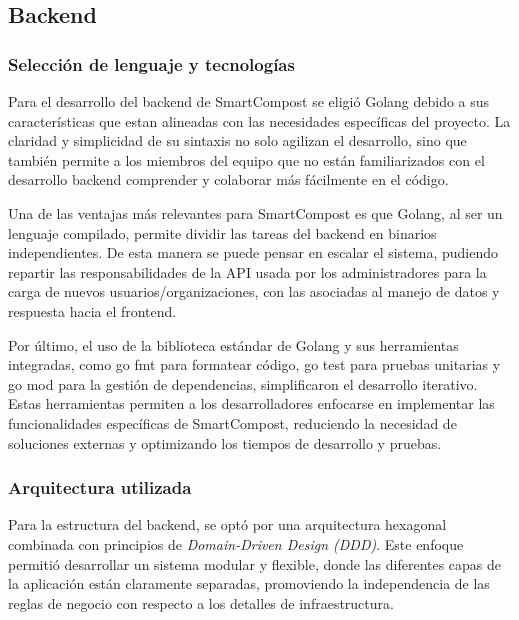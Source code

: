 {%
\subsection{Backend}
\subsubsection{Selección de lenguaje y tecnologías}

Para el desarrollo del backend de SmartCompost se eligió Golang debido a sus características que estan alineadas con las necesidades específicas del proyecto. La claridad y simplicidad de su sintaxis no solo agilizan el desarrollo, sino que también permite a los miembros del equipo que no están familiarizados con el desarrollo backend comprender y colaborar más fácilmente en el código. 

Una de las ventajas más relevantes para SmartCompost es que Golang, al ser un lenguaje compilado, permite dividir las tareas del backend en binarios independientes. De esta manera se puede pensar en escalar el sistema, pudiendo repartir las responsabilidades de la API usada por los administradores para la carga de nuevos usuarios/organizaciones, con las asociadas al manejo de datos y respuesta hacia el frontend. 

Por último, el uso de la biblioteca estándar de Golang \cite{GoStdlibTesting} y sus herramientas integradas, como go fmt para formatear código, go test para pruebas unitarias y go mod para la gestión de dependencias, simplificaron el desarrollo iterativo. Estas herramientas permiten a los desarrolladores enfocarse en implementar las funcionalidades específicas de SmartCompost, reduciendo la necesidad de soluciones externas y optimizando los tiempos de desarrollo y pruebas.


\subsubsection{Arquitectura utilizada}
Para la estructura del backend, se optó por una arquitectura hexagonal \citep{ArquitecturaHexagonal:15} combinada con principios de \textit{Domain-Driven Design (DDD)}\cite{Evans2003}. Este enfoque permitió desarrollar un sistema modular y flexible, donde las diferentes capas de la aplicación están claramente separadas, promoviendo la independencia de las reglas de negocio con respecto a los detalles de infraestructura.


}
